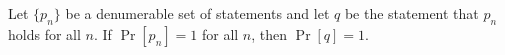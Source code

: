 Let $\{p_n\}$ be a denumerable set of statements and let $q$ be the statement that $p_n$ holds for all $n$. If $\Pr[p_n] = 1$ for all $n$, then $\Pr[q] = 1.$
